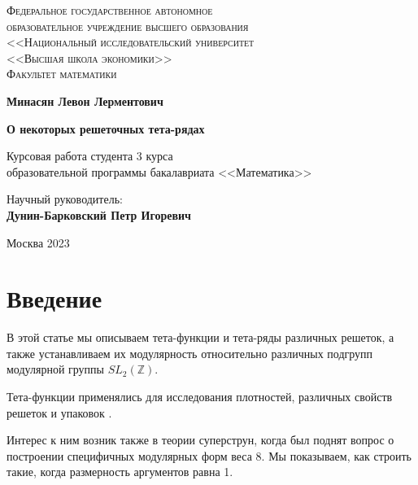 \documentclass{article}
\title{}
\author{}
\newcommand{\ZZ}{\mathbb{Z}}
\theoremstyle{break}
\begin{document}
\begin{center}
	{\scshape Федеральное государственное автономное\\
		образовательное учреждение высшего образования\\
		<<Национальный исследовательский университет\\
		<<Высшая школа экономики>>\\[1ex]
		Факультет математики\par}
	
	\par\vfill
	
	\textbf{\large Минасян Левон Лерментович}
	
	\vspace{1.5cm}
	
	{\Large\bfseries
		О некоторых решеточных тета-рядах
		\par}
	
	\vspace{1.5cm}
	
	Курсовая работа студента 3 курса\\[1ex]
	образовательной программы бакалавриата <<Математика>>
	\par\vfill
	\noindent\hspace{0.52\textwidth}\parbox[t]{0.48\textwidth}{%
		Научный руководитель:\\[3pt]
		\textbf{Дунин-Барковский Петр Игоревич}\\[2ex]
	}%
	\par\vfill
	Москва 2023
\end{center}
\thispagestyle{empty}
\pagebreak

\section{Введение}
В этой статье мы описываем тета-функции и тета-ряды различных решеток, а также 
устанавливаем их модулярность относительно различных подгрупп модулярной группы
$SL_2(\ZZ)$.

Тета-функции применялись для исследования плотностей,  различных свойств решеток и упаковок \cite{conway}. 

Интерес к ним возник также в теории суперструн, когда был поднят вопрос о построении специфичных модулярных форм веса 8. Мы показываем, как строить такие, когда размерность аргументов равна 1.
\end{document}
